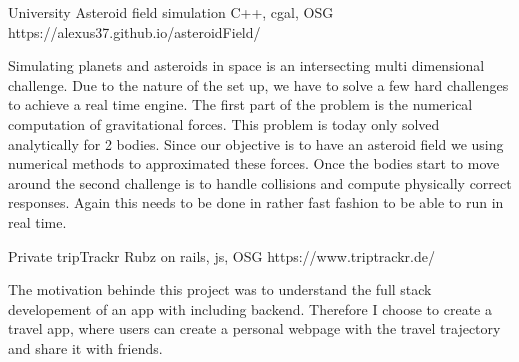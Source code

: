 

\begin{cventries}

  \cventry
    {University}
    {Asteroid field simulation} %
    {C++, cgal, OSG} %
    {https://alexus37.github.io/asteroidField/} %
    {
      \begin{cvitems} %
        \item {Simulating planets and asteroids in space is an intersecting multi dimensional challenge. Due to the nature of the set up, we have to solve a few hard challenges to achieve a real time engine. The first part of the problem is the numerical computation of gravitational forces. This problem is today only solved analytically for 2 bodies. Since our objective is to have an asteroid field we using numerical methods to approximated these forces. Once the bodies start to move around the second challenge is to handle collisions and compute physically correct responses. Again this needs to be done in rather fast fashion to be able to run in real time.}
      \end{cvitems}
    }

  \cventry
    {Private}
    {tripTrackr} %
    {Rubz on rails, js, OSG} %
    {https://www.triptrackr.de/} %
    {
      \begin{cvitems} %
        \item {
The motivation behinde this project was to understand the full stack developement of an app with including backend. Therefore I choose to create a travel app, where users can create a personal webpage with the travel trajectory and share it with friends.
        }
      \end{cvitems}
    }
    

\end{cventries}
